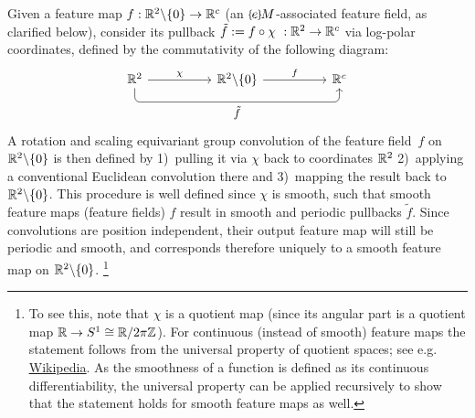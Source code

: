 Given a feature map $f: \mathbb{R}^2 \backslash \{0\} \to \mathbb{R}^c$ (an $\eM$-associated feature field, as clarified below), \citet{esteves2017polar} consider its pullback $\tilde{f} := f \circ \chi \ : \mathbb{R}^2 \to \mathbb{R}^c$ via log-polar coordinates, defined by the commutativity of the following diagram:
\begin{equation}
\begin{tikzcd}[row sep=2.5em, column sep=5.em]
    \R^2
        \arrow[r, "\chi"]
        \arrow[rr, rounded corners, to path={ 
                |- node[below, pos=.75]{\small$\tilde{f}$} ([yshift=-2.5ex, xshift=0ex]\tikztotarget.south)
                -- ([xshift=0ex]\tikztotarget.south)
                }]
    & \R^2 \backslash \{0\}
        \arrow[r, "f"]
    & \R^c
\end{tikzcd}
\end{equation}
A rotation and scaling equivariant group convolution of the feature field~$f$ on $\mathbb{R}^2 \backslash \{0\}$ is then defined by
1)~pulling it via $\chi$ back to coordinates $\mathbb{R}^2$
2)~applying a conventional Euclidean convolution there and
3)~mapping the result back to $\mathbb{R}^2 \backslash \{0\}$.
This procedure is well defined since $\chi$ is smooth, such that smooth feature maps (feature fields) $f$ result in smooth and periodic pullbacks $\tilde{f}$.
Since convolutions are position independent, their output feature map will still be periodic and smooth, and corresponds therefore uniquely to a smooth feature map on $\mathbb{R}^2 \backslash \{0\}$.%
\footnote{
    To see this, note that $\chi$ is a quotient map (since its angular part is a quotient map $\mathbb{R} \to S^1 \cong \mathbb{R}/2\pi\mathbb{Z}$).
    For continuous (instead of smooth) feature maps the statement follows from the universal property of quotient spaces; see e.g.
    \href{https://en.wikipedia.org/wiki/Quotient_space_(topology)\#Properties}{\underline{Wikipedia}}.
    As the smoothness of a function is defined as its continuous differentiability, the universal property can be applied recursively to show that the statement holds for smooth feature maps as well.
}

